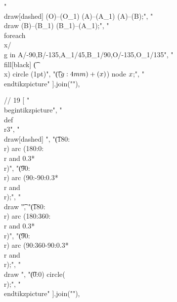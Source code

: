 "\t\\draw[dashed] (O)--(O_1) (A)--(A_1) (A)--(B);",
"\t\\draw (B)--(B_1) (B_1)--(A_1);",
"\t\\foreach \\x/\\g in {A/-90,B/-135,A_1/45,B_1/90,O/-135,O_1/135}",
"\t\\fill[black] \t(\\x) circle (1pt)",
"\t($(\\g:4mm)+(\\x)$) node {$\\x$};",
"\\end{tikzpicture}"
].join("\n"),

// 19
[
"\\begin{tikzpicture}",
"\t\\def\\r{3}",
"\t\\draw[dashed] ",
"\t(180:\\r) arc (180:0:{\\r} and {0.3*\\r})",
"\t(90:\\r)  arc (90:-90:{0.3*\\r} and {\\r});",
"\t\\draw \t",
"\t(180:\\r) arc (180:360:{\\r} and {0.3*\\r})",
"\t(90:\\r)  arc (90:360-90:{0.3*\\r} and {\\r});",
"\t\\draw ",
"\t(0:0) circle(\\r);",
"\\end{tikzpicture}"
].join("\n"),

